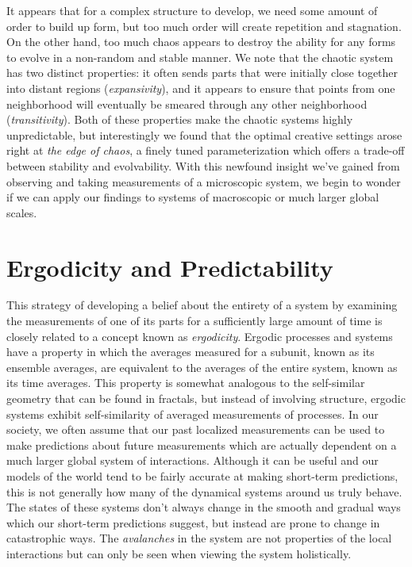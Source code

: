\documentclass{article}
\begin{document}
It appears that for a complex structure to develop, we need some amount of order to build up form, but too much order will create repetition and stagnation. On the other hand, too much chaos appears to destroy the ability for any forms to evolve in a non-random and stable manner. We note that the chaotic system has two distinct properties: it often sends parts that were initially close together into distant regions (\emph{expansivity}), and it appears to ensure that points from one neighborhood will eventually be smeared through any other neighborhood (\emph{transitivity}). Both of these properties make the chaotic systems highly unpredictable, but interestingly we found that the optimal creative settings arose right at \emph{the edge of chaos}, a finely tuned parameterization which offers a trade-off between stability and evolvability. With this newfound insight we've gained from observing and taking measurements of a microscopic system, we begin to wonder if we can apply our findings to systems of macroscopic or much larger global scales.

\section{Ergodicity and Predictability}
This strategy of developing a belief about the entirety of a system by examining the measurements of one of its parts for a sufficiently large amount of time is closely related to a concept known as \emph{ergodicity}. Ergodic processes and systems have a property in which the averages measured for a subunit, known as its ensemble averages, are equivalent to the averages of the entire system, known as its time averages. This property is somewhat analogous to the self-similar geometry that can be found in fractals, but instead of involving structure, ergodic systems exhibit self-similarity of averaged measurements of processes. In our society, we often assume that our past localized measurements can be used to make predictions about future measurements which are actually dependent on a much larger global system of interactions. Although it can be useful and our models of the world tend to be fairly accurate at making short-term predictions, this is not generally how many of the dynamical systems around us truly behave. The states of these systems don't always change in the smooth and gradual ways which our short-term predictions suggest, but instead are prone to change in catastrophic ways. The \emph{avalanches} in the system are not properties of the local interactions but can only be seen when viewing the system holistically.
\end{document}
